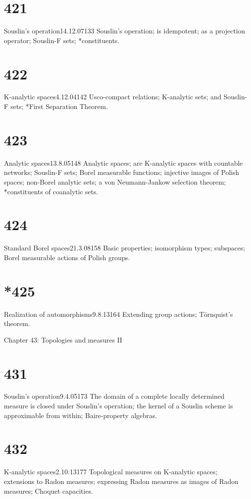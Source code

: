 
\section{421}{Souslin's operation}{14.12.07}{133}{}
{Souslin's operation;  is idempotent;  as a projection operator;
Souslin-F sets;  *constituents.}

\section{422}{K-analytic spaces}{4.12.04}{142}{}
{Usco-compact relations;  K-analytic sets;  and Souslin-F sets;
*First Separation Theorem.}

\section{423}{Analytic spaces}{13.8.05}{148}{}
{Analytic spaces;  are K-analytic spaces with countable networks;
Souslin-F sets;   Borel measurable functions;  injective images of
Polish spaces;  non-Borel analytic sets;  a von Neumann-Jankow
selection theorem;  *constituents of coanalytic sets.}

\section{424}{Standard Borel spaces}{21.3.08}{158}{}
{Basic properties;  isomorphism types;  subspaces;  Borel
measurable actions of Polish groups.}

\section{*425}{Realization of automorphisms}{9.8.13}{164}{}
{Extending group actions;  T\"ornquist's theorem.}


Chapter 43: Topologies and measures II


\section{431}{Souslin's operation}{9.4.05}{173}{}
{The domain of a complete locally determined measure is closed
under Souslin's operation;  the kernel of a Souslin scheme is
approximable from within;  Baire-property algebras.}

\section{432}{K-analytic spaces}{2.10.13}{177}{}
{Topological measures on K-analytic spaces;  extensions to Radon
measures;  expressing Radon measures as images of Radon measures;
Choquet capacities.}

